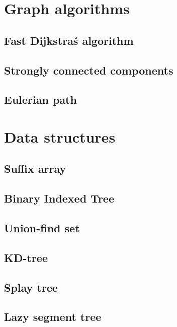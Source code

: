\documentclass[twocolumn]{article}
\begin{document}
\begin{landscape}
\section{Graph algorithms}
\subsection{Fast Dijkstra\'s algorithm}
\raggedbottom
\subsection{Strongly connected components}
\raggedbottom
\subsection{Eulerian path}
\raggedbottom

\section{Data structures}
\subsection{Suffix array}
\raggedbottom
\subsection{Binary Indexed Tree}
\raggedbottom
\subsection{Union-find set}
\raggedbottom
\subsection{KD-tree}
\raggedbottom
\subsection{Splay tree}
\raggedbottom
\subsection{Lazy segment tree}
\raggedbottom

\end{landscape}
\end{document}
